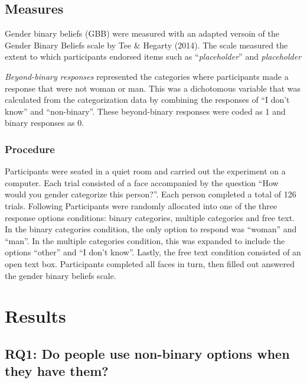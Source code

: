 \documentclass[
  man]{apa7}
\begin{document}
\hypertarget{measures}{%
\subsection{Measures}\label{measures}}

Gender binary beliefs (GBB) were measured with an adapted versoin of the Gender Binary Beliefs scale by Tee \& Hegarty (2014). The scale measured the extent to which participants endorsed items such as ``\emph{placeholder}'' and \emph{placeholder}

\emph{Beyond-binary responses} represented the categories where participants made a response that were not woman or man. This was a dichotomous variable that was calculated from the categorization data by combining the responses of ``I don't know'' and ``non-binary''. These beyond-binary responses were coded as 1 and binary responses as 0.

\hypertarget{procedure}{%
\subsubsection{Procedure}\label{procedure}}

Participants were seated in a quiet room and carried out the experiment on a computer. Each trial consisted of a face accompanied by the question ``How would you gender categorize this person?''. Each person completed a total of 126 trials. Following Participants were randomly allocated into one of the three response options conditions: binary categories, multiple categories and free text. In the binary categories condition, the only option to respond was ``woman'' and ``man''. In the multiple categories condition, this was expanded to include the options ``other'' and ``I don't know''. Lastly, the free text condition consisted of an open text box. Participants completed all faces in turn, then filled out answered the gender binary beliefs scale.

\hypertarget{results}{%
\section{Results}\label{results}}

\hypertarget{rq1-do-people-use-non-binary-options-when-they-have-them}{%
\subsection{RQ1: Do people use non-binary options when they have them?}\label{rq1-do-people-use-non-binary-options-when-they-have-them}}
\end{document}
